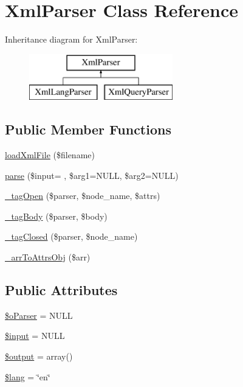 \hypertarget{classXmlParser}{}\section{Xml\+Parser Class Reference}
\label{classXmlParser}
Inheritance diagram for Xml\+Parser\+:\begin{figure}[H]
\begin{center}
\leavevmode
\includegraphics[height=2.000000cm]{classXmlParser}
\end{center}
\end{figure}
\subsection*{Public Member Functions}
\begin{DoxyCompactItemize}
\item 
\hyperlink{classXmlParser_a3975b17b893e196069963d433046771b}{load\+Xml\+File} (\$filename)
\item 
\hyperlink{classXmlParser_aa7b52a3ab42568f6f49056d928688e7a}{parse} (\$input= \textquotesingle{}\textquotesingle{}, \$arg1=N\+U\+L\+L, \$arg2=N\+U\+L\+L)
\item 
\hyperlink{classXmlParser_a01facf5db302e49b0b61fb0e1b1fee36}{\+\_\+tag\+Open} (\$parser, \$node\+\_\+name, \$attrs)
\item 
\hyperlink{classXmlParser_a1205550b688631ab1296365904c61a92}{\+\_\+tag\+Body} (\$parser, \$body)
\item 
\hyperlink{classXmlParser_acb524a3ecf27535c9b085a93d714e1c5}{\+\_\+tag\+Closed} (\$parser, \$node\+\_\+name)
\item 
\hyperlink{classXmlParser_ad6c6c76f2e0c9fbd04c071fc30f1a193}{\+\_\+arr\+To\+Attrs\+Obj} (\$arr)
\end{DoxyCompactItemize}
\subsection*{Public Attributes}
\begin{DoxyCompactItemize}
\item 
\hyperlink{classXmlParser_aeee1082b5150f2adb53b16b42ca1b9f5}{\$o\+Parser} = N\+U\+L\+L
\item 
\hyperlink{classXmlParser_a65903457181cddd5d100685e0d6ba66a}{\$input} = N\+U\+L\+L
\item 
\hyperlink{classXmlParser_aa4324be74ded61847ce33730c7785389}{\$output} = array()
\item 
\hyperlink{classXmlParser_adbe603248522105c2912dcddeedcd6ab}{\$lang} = \char`\"{}en\char`\"{}
\end{DoxyCompactItemize}


